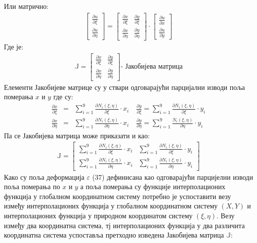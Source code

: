 \documentclass[11pt, a4paper]{article}
\begin{document}
Или матрично:
\begin{eqnarray}
\begin{bmatrix}
\frac{\partial u}{\partial \xi}\\
\frac{\partial u}{\partial \eta}
\end{bmatrix}
=
\begin{bmatrix}
\frac{\partial x}{\partial \xi} & \frac{\partial y}{\partial \xi} \\
\frac{\partial x}{\partial \eta} & \frac{\partial y}{\partial \eta}
\end{bmatrix}
\cdot
\begin{bmatrix}
\frac{\partial u}{\partial x} \\
\frac{ \partial u}{\partial y}
\end{bmatrix}
\end{eqnarray}
Где је:
\begin{eqnarray}
\mathbb{J} = 
\begin{bmatrix}
\frac{\partial x}{\partial \xi} & \frac{\partial y}{\partial \xi} \\
\frac{\partial x}{\partial \eta} & \frac{\partial y}{\partial \eta}
\end{bmatrix}
\text{- Јакобијева матрица}
\end{eqnarray}
Елементи Јакобијеве матрице су у ствари одговарајући парцијални изводи поља померања $x$ и $y$ где су:
\begin{eqnarray}
\frac{\partial x}{\partial \xi} &=& \sum_{i=1} ^ 9 \frac{\partial N_i(\xi, \eta)}{\partial \xi} \cdot x_i \quad \frac{\partial y}{\partial \xi} = \sum_{i=1} ^ 9 \frac{\partial N_i(\xi, \eta)}{\partial \xi} \cdot y_i \\
\frac{\partial x}{\partial \eta} &=& \sum_{i=1} ^ 9 \frac{\partial N_i(\xi, \eta)}{\partial \eta} \cdot x_i \quad \frac{\partial y}{\partial \eta} = \sum_{i=1} ^ 9 \frac{N_i(\xi, \eta)}{\partial \eta} \cdot y_i
\end{eqnarray}
Па се Јакобијева матрица може приказати и као:
\begin{eqnarray}
\mathbb{J} = 
\begin{bmatrix}
\sum_{i=1} ^ 9 \frac{\partial N_i(\xi, \eta)}{\partial \xi} \cdot x_i & \sum_{i=1} ^ 9 \frac{\partial N_i(\xi, \eta)}{\partial \xi} \cdot y_i \\
\sum_{i=1} ^ 9 \frac{\partial N_i(\xi, \eta)}{\partial \eta} \cdot x_i & \sum_{i=1} ^ 9 \frac{\partial N_i(\xi, \eta)}{\partial \eta} \cdot y_i
\end{bmatrix}
\end{eqnarray}
Како су поља деформација $\varepsilon$ (37) дефинисана као одговарајући парцијелни изводи поља померања  по $x$ и $y$ а поља померања су функције интерполационих функција у глобалном координатном систему потребно је успоставити везу између интерполационих функција у глобалном координатном систему $(X,Y)$ и интерполационих функција у природном координатом систему $(\xi, \eta)$. Везу између два координатна система, тј интерполационих функција у два различита координатна система успоставља претходно изведена Јакобијева матрица $\mathbb{J}$:
\end{document}
